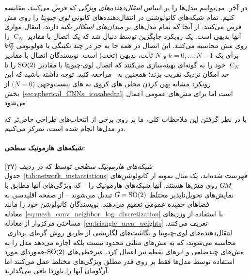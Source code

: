 در آخر، می‌توانیم مدل‌ها را بر اساس \emph{انتقال‌دهنده‌های ویژگی} که فرض می‌کنند، مقایسه کنیم.
تمام شبکه‌های کانولوشنی در \cite{Wiersma2020,poulenard2018multi,sun2018zernet,deHaan2020meshCNNs} انتقال‌دهنده‌های کانونی \emph{لوی-چیویتا} را روی مش فرض می‌کنند.
از آنجا که تمام مدل‌های \cite{masci2015geodesic,monti2017geometric,sun2018zernet,huang2019texturenet} بر \emph{میدان‌های اسکالر} تکیه دارند، انتقال موازی آنها بدیهی است.
یک رویکرد جایگزین توسط \citet{Yang2020parallelFrameCNN} دنبال شد که یک اتصال با مقادیر $\operatorname{C}_N$ را روی مش محاسبه می‌کنند.
این اتصال در همه جا به جز در چند تکینگی با هولونومی $k\frac{2\pi}{N}$ برای یک $k=0,\dots,N-1$ و $N$ ثابت، بدیهی (تخت) است.
نویسندگان اتصال با مقادیر $\operatorname{C}_N$ خود را به گونه‌ای بهینه‌سازی می‌کنند که اتصال لوی-چیویتا با مقادیر $\operatorname{SO}(2)$ را تا حد امکان نزدیک تقریب بزند؛ همچنین به~\cite{craneTrivialConnectionsDiscrete2010} مراجعه کنید.
توجه داشته باشید که این رویکرد مشابه پهن کردن محلی های کروی به های بیست‌وجهی ($N=6$) از بخش~\ref{sec:spherical_CNNs_icosahedral} است اما برای مش‌های عمومی اعمال می‌شود.




با در نظر گرفتن این ملاحظات کلی، ما بر روی برخی از انتخاب‌های طراحی خاص‌تر که در مدل‌ها انجام شده است، تمرکز می‌کنیم.


\paragraph{شبکه‌های هارمونیک سطحی:}
\emph{شبکه‌های هارمونیک سطحی} توسط \citet{Wiersma2020} که در ردیف (۳۷) جدول~\ref{tab:network_instantiations} فهرست شده‌اند،
یک مثال نمونه از کانولوشن‌های $G\mkern-1.4muM$ روی مش‌ها هستند.
آنها شبکه‌های هارمونیک \cite{Worrall2017-HNET} را -- که ویژگی‌های آنها مطابق با نمایش‌های تحویل‌ناپذیر مختلط $G=\operatorname{SO}(2)$ تبدیل می‌شوند -- از صفحه اقلیدسی به فضاهای خمیده عمومی تعمیم می‌دهند.
نویسندگان کانولوشن خود را مانند معادله~\eqref{eq:mesh_conv_neighbor_log_discretization} با استفاده از وزن‌های مساحتی مرکزوار از معادله~\eqref{eq:triangle_area_weights} تعریف می‌کنند.
انتقال‌دهنده‌های لوی-چیویتا و نگاشت‌های لگاریتمی از طریق روش گرمای برداری~\cite{Sharp2019VectorHeatMethod} محاسبه می‌شوند، که به مش‌های مثلثی محدود نیست بلکه اجازه می‌دهد مدل را به مش‌های چندضلعی و ابرهای نقطه نیز اعمال کرد.
غیرخطی‌های $\operatorname{SO}(2)$-هموردای مورد استفاده توسط مدل‌ها فقط بر روی قدر مطلق ویژگی‌های مختلط عمل می‌کنند اما آرگومان آنها را ناوردا باقی می‌گذارند.

